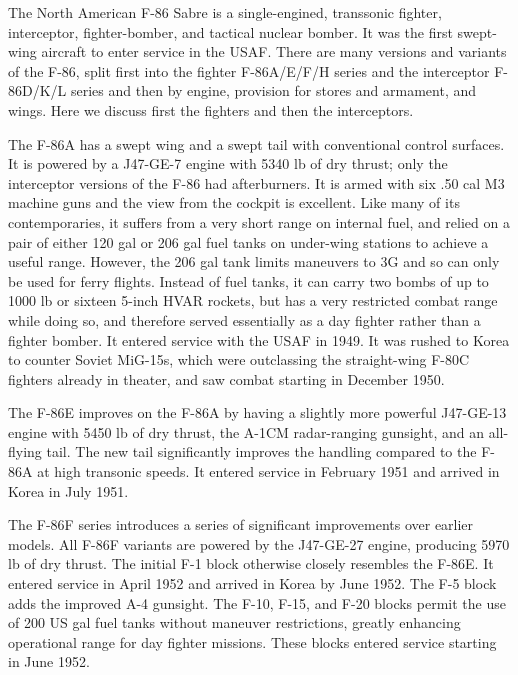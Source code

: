 
The North American F-86 Sabre is a single-engined, transsonic fighter, interceptor, fighter-bomber, and tactical nuclear bomber. It was the first swept-wing aircraft to enter service in the USAF. There are many versions and variants of the F-86, split first into the fighter F-86A/E/F/H series and the interceptor F-86D/K/L series and then by engine, provision for stores and armament, and wings. Here we discuss first the fighters and then the interceptors.

The F-86A has a swept wing and a swept tail with conventional control surfaces. It is powered by a J47-GE-7 engine with 5340 lb of dry thrust; only the interceptor versions of the F-86 had afterburners. It is armed with six .50 cal M3 machine guns and the view from the cockpit is excellent. Like many of its contemporaries, it suffers from a very short range on internal fuel, and relied on a pair of either 120 gal or 206 gal fuel tanks on under-wing stations to achieve a useful range. However, the 206 gal tank limits maneuvers to 3G and so can only be used for ferry flights. Instead of fuel tanks, it can carry two bombs of up to 1000 lb or sixteen 5-inch HVAR rockets, but has a very restricted combat range while doing so, and therefore served essentially as a day fighter rather than a fighter bomber. It entered service with the USAF in 1949. It was rushed to Korea to counter Soviet MiG-15s, which were outclassing the straight-wing F-80C fighters already in theater, and saw combat starting in December 1950.

The F-86E improves on the F-86A by having a slightly more powerful J47-GE-13 engine with 5450 lb of dry thrust, the A-1CM radar-ranging gunsight, and an all-flying tail. The new tail significantly improves the handling compared to the F-86A at high transonic speeds. It entered service in February 1951 and arrived in Korea in July 1951.

The F-86F series introduces a series of significant improvements over earlier models. All F-86F variants are powered by the J47-GE-27 engine, producing 5970 lb of dry thrust. The initial F-1 block otherwise closely resembles the F-86E. It entered service in April 1952 and arrived in Korea by June 1952. The F-5 block adds the improved A-4 gunsight. The F-10, F-15, and F-20 blocks permit the use of 200 US gal fuel tanks without maneuver restrictions, greatly enhancing operational range for day fighter missions. These blocks entered service starting in June 1952.

